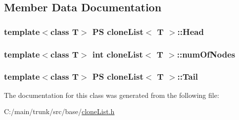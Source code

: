 \subsection{Member Data Documentation}
\hypertarget{classclone_list_a63ed3a2d8150bd059b176d2e3ac5264c}{
\subsubsection[{Head}]{\setlength{\rightskip}{0pt plus 5cm}template$<$class T$>$ {\bf PS} {\bf cloneList}$<$ T $>$::{\bf Head}}}
\label{classclone_list_a63ed3a2d8150bd059b176d2e3ac5264c}
\hypertarget{classclone_list_a48e08f8fdedcda74b4d6afa17774e528}{
\subsubsection[{numOfNodes}]{\setlength{\rightskip}{0pt plus 5cm}template$<$class T$>$ int {\bf cloneList}$<$ T $>$::{\bf numOfNodes}}}
\label{classclone_list_a48e08f8fdedcda74b4d6afa17774e528}
\hypertarget{classclone_list_afc47ac761c75b14e0965888da6370790}{
\subsubsection[{Tail}]{\setlength{\rightskip}{0pt plus 5cm}template$<$class T$>$ {\bf PS} {\bf cloneList}$<$ T $>$::{\bf Tail}}}
\label{classclone_list_afc47ac761c75b14e0965888da6370790}


The documentation for this class was generated from the following file:\begin{DoxyCompactItemize}
\item 
C:/main/trunk/src/base/\hyperlink{clone_list_8h}{cloneList.h}\end{DoxyCompactItemize}
